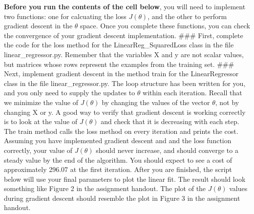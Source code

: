 \documentclass[11pt]{article}
\begin{document}
\textbf{Before you run the contents of the cell below}, you will need to
implement two functions: one for calcuating the loss \(J(\theta)\), and
the other to perform gradient descent in the \(\theta\) space. Once you
complete these functions, you can check the convergence of your gradient
descent implementation. \#\#\# First, complete the code for the loss
method for the LinearReg\_SquaredLoss class in the file
linear\_regressor.py. Remember that the variables X and y are not scalar
values, but matrices whose rows represent the examples from the training
set. \#\#\# Next, implement gradient descent in the method train for the
LinearRegressor class in the file linear\_regressor.py. The loop
structure has been written for you, and you only need to supply the
updates to \(\theta\) within each iteration. Recall that we minimize the
value of \(J(\theta)\) by changing the values of the vector \(\theta\),
not by changing X or y. A good way to verify that gradient descent is
working correctly is to look at the value of \(J(\theta)\) and check
that it is decreasing with each step. The train method calls the loss
method on every iteration and prints the cost. Assuming you have
implemented gradient descent and and the loss function correctly, your
value of \(J(\theta)\) should never increase, and should converge to a
steady value by the end of the algorithm. You should expect to see a
cost of approximately 296.07 at the first iteration. After you are
finished, the script below will use your final parameters to plot the
linear fit. The result should look something like Figure 2 in the
assignment handout. The plot of the \(J(\theta)\) values during gradient
descent should resemble the plot in Figure 3 in the assignment handout.
\end{document}
